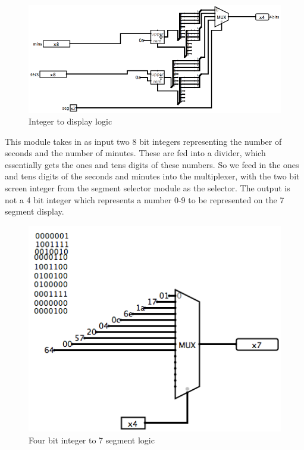 \documentclass{article}
\begin{document}
\begin{figure}[H]
	\begin{center}
		\includegraphics[width=1\textwidth]{select4bits.png} 
		\caption{Integer to display logic}
	\end{center}
\end{figure}

This module takes in as input two 8 bit integers representing the number of seconds and the number of minutes. These are fed into a divider, which essentially gets the ones and tens digits of these numbers. So we feed in the ones and tens digits of the seconds and minutes into the multiplexer, with the two bit screen integer from the segment selector module as the selector. The output is not a 4 bit integer which represents a number 0-9 to be represented on the 7 segment display. 

\begin{figure}[H]
	\begin{center}
		\includegraphics[width=1\textwidth]{7seg.png} 
		\caption{Four bit integer to 7 segment logic}
	\end{center}
\end{figure}
\end{document}
